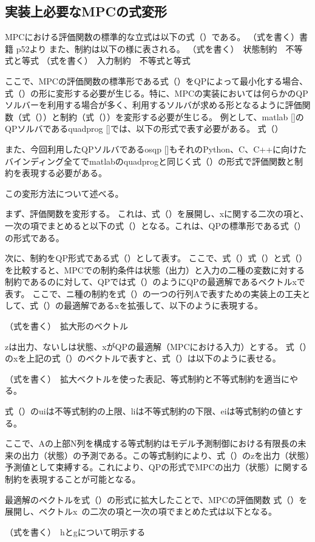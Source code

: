 \subsection{実装上必要なMPCの式変形}
MPCにおける評価関数の標準的な立式は以下の式（）である。
（式を書く）書籍 p52より
また、制約は以下の様に表される。
（式を書く）　状態制約　不等式と等式
（式を書く）　入力制約　不等式と等式

ここで、MPCの評価関数の標準形である式（）をQPによって最小化する場合、式（）の形に変形する必要が生じる。特に、MPCの実装においては何らかのQPソルバーを利用する場合が多く、利用するソルバが求める形となるように評価関数（式（））と制約（式（））を変形する必要が生じる。
例として、matlab []のQPソルバであるquadprog []では、以下の形式で表す必要がある。
式（）

また、今回利用したQPソルバであるosqp []もそれのPython、C、C++に向けたバインディング全てでmatlabのquadprogと同じく式（）の形式で評価関数と制約を表現する必要がある。

この変形方法について述べる。

まず、評価関数を変形する。
これは、式（）を展開し、xに関する二次の項と、一次の項でまとめると以下の式（）となる。これは、QPの標準形である式（）の形式である。


次に、制約をQP形式である式（）として表す。
ここで、式（）式（）と式（）を比較すると、MPCでの制約条件は状態（出力）と入力の二種の変数に対する制約であるのに対して、QPでは式（）のようにQPの最適解であるベクトルxで表す。
ここで、ニ種の制約を式（）の一つの行列Aで表すための実装上の工夫として、式（）の最適解であるxを拡張して、以下のように表現する。

（式を書く）　拡大形のベクトル

zは出力、ないしは状態、xがQPの最適解（MPCにおける入力）とする。
式（）のxを上記の式（）のベクトルで表すと、式（）は以下のように表せる。

（式を書く）　拡大ベクトルを使った表記、等式制約と不等式制約を適当にやる。

式（）のuiは不等式制約の上限、liは不等式制約の下限、eiは等式制約の値とする。

ここで、Aの上部N列を構成する等式制約はモデル予測制御における有限長の未来の出力（状態）の予測である。この等式制約により、式（）のzを出力（状態）予測値として束縛する。これにより、QPの形式でMPCの出力（状態）に関する制約を表現することが可能となる。

最適解のベクトルを式（）の形式に拡大したことで、MPCの評価関数 式（）を展開し、ベクトルx~の二次の項と一次の項でまとめた式は以下となる。

（式を書く）　hとgについて明示する
